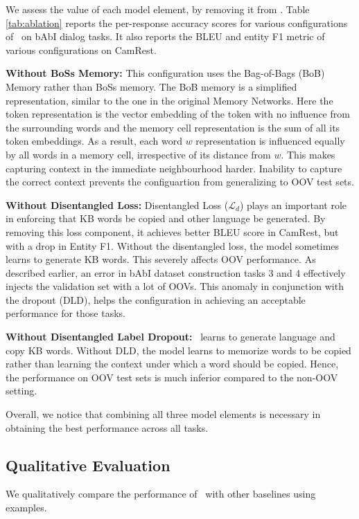 We assess the value of each model element, by removing it from \sys. Table \ref{tab:ablation} reports the per-response accuracy scores for various configurations of \sys\ on bAbI dialog tasks. It also reports the BLEU and entity F1 metric of various configurations on CamRest.

\noindent \textbf{Without BoSs Memory:} 
This configuration uses the Bag-of-Bags (BoB) Memory rather than {\sc BoSs} memory. The BoB memory is a simplified representation, similar to the one in the original Memory Networks. Here the token representation is the vector embedding of the token with no influence from the surrounding words and the memory cell representation is the sum of all its token embeddings. As a result, each word $w$ representation is influenced equally by all words in a memory cell, irrespective of its distance from $w$. This makes capturing context in the immediate neighbourhood harder. Inability to capture the correct context prevents the configuartion from generalizing to OOV test sets.

\noindent \textbf{Without Disentangled Loss:} Disentangled Loss ($\mathcal{L}_{d}$) plays an important role in enforcing that KB words be copied and other language be generated. By removing this loss component, 
it achieves better BLEU score in CamRest, but with a drop in Entity F1. Without the disentangled loss, the model sometimes learns to generate KB words. This severely affects OOV performance. As described earlier, an error in bAbI dataset construction tasks 3 and 4 effectively injects the validation set with a lot of OOVs. This anomaly in conjunction with the dropout (DLD), helps the configuration in achieving an acceptable performance for those tasks.

\noindent \textbf{Without Disentangled Label Dropout:} 
\sys\ learns to generate language and copy KB words. Without DLD, the model learns to memorize words to be copied rather than learning the context under which a word should be copied. Hence, the performance on OOV test sets is much inferior compared to the non-OOV setting.

Overall, we notice that combining all three model elements is necessary in obtaining the best performance across all tasks.


\subsection{Qualitative Evaluation}
We qualitatively compare the performance of \sys\ with other baselines using examples.


